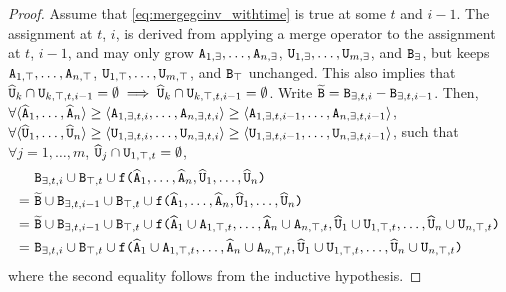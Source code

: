 \begin{proof}
Assume that \eqref{eq:mergegcinv_withtime} is true at some $t$ and $i-1$.
The assignment at $t$, $i$, is derived from applying a merge operator to the assignment at $t$, $i-1$, and may only grow $\tt{A}_{1,\exists}, \dots, \tt{A}_{n,\exists}$, $\tt{U}_{1,\exists}, \dots, \tt{U}_{m,\exists}$, and $\tt{B}_\exists$,
but keeps $\tt{A}_{1,\top}, \dots, \tt{A}_{n,\top}$, $\tt{U}_{1,\top}, \dots, \tt{U}_{m,\top}$, and $\tt{B}_\top$ unchanged.
This also implies that $\widehat{\tt{U}}_k \cap \tt{U}_{k,\top,t,i-1} = \emptyset \implies \widehat{\tt{U}}_k \cap \tt{U}_{k,\top,t,i-1} = \emptyset$.
Write $\widetilde{\tt{B}} = \tt{B}_{\exists,t,i} - \tt{B}_{\exists,t,i-1}$.
Then, $\forall \langle \widehat{\tt{A}}_1, \dots, \widehat{\tt{A}}_n\rangle \geq \langle \tt{A}_{1,\exists,t,i},\dots,\tt{A}_{n,\exists,t,i} \rangle \geq \langle \tt{A}_{1,\exists,t,i-1},\dots,\tt{A}_{n,\exists,t,i-1} \rangle$,
$\forall \langle \widehat{\tt{U}}_1, \dots, \widehat{\tt{U}}_n\rangle \geq \langle \tt{U}_{1,\exists,t,i},\dots,\tt{U}_{n,\exists,t,i} \rangle \geq \langle \tt{U}_{1,\exists,t,i-1},\dots,\tt{U}_{n,\exists,t,i-1} \rangle$,
such that
$\forall j=1,\dots,m$, $\widehat{\tt{U}}_j \cap \tt{U}_{1,\top,t} = \emptyset$,
\begin{align*}
&\tt{B}_{\exists,t,i} \cup \tt{B}_{\top,t}
\cup
\tt{f(}
  \widehat{\tt{A}}_1,
    \dots,
    \widehat{\tt{A}}_n,
  \widehat{\tt{U}}_1,
    \dots,
    \widehat{\tt{U}}_n
\tt{)}\\
=~&
\widetilde{\tt{B}} \cup \tt{B}_{\exists,t,i-1} \cup \tt{B}_{\top,t}
\cup
\tt{f(}
  \widehat{\tt{A}}_1,
    \dots,
    \widehat{\tt{A}}_n,
  \widehat{\tt{U}}_1,
    \dots,
    \widehat{\tt{U}}_n
\tt{)}\\
=~&
\widetilde{\tt{B}} \cup \tt{B}_{\exists,t,i-1} \cup \tt{B}_{\top,t}
\cup
\tt{f(}
  \widehat{\tt{A}}_1 \cup \tt{A}_{1,\top,t},
  \dots,
  \widehat{\tt{A}}_n \cup \tt{A}_{n,\top,t},
  \widehat{\tt{U}}_1 \cup \tt{U}_{1,\top,t},
  \dots,
  \widehat{\tt{U}}_n \cup \tt{U}_{n,\top,t}
\tt{)}\\
=~&
\tt{B}_{\exists,t,i} \cup \tt{B}_{\top,t}
\cup
\tt{f(}
  \widehat{\tt{A}}_1 \cup \tt{A}_{1,\top,t},
  \dots,
  \widehat{\tt{A}}_n \cup \tt{A}_{n,\top,t},
  \widehat{\tt{U}}_1 \cup \tt{U}_{1,\top,t},
  \dots,
  \widehat{\tt{U}}_n \cup \tt{U}_{n,\top,t}
\tt{)}
\end{align*}
where the second equality follows from the inductive hypothesis.


\end{proof}
